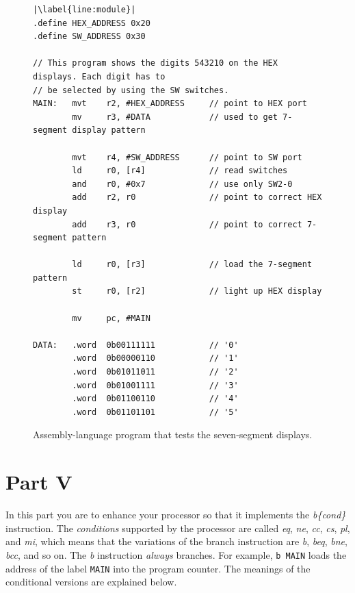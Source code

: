 \documentclass[epsfig,10pt,fullpage]{article} \addtolength{\textwidth}{1.5in}
\begin{document}
\lstset{language=ASM,numbers=none,escapechar=|}
\begin{figure}[h]
\begin{center}
\begin{minipage}[h]{15 cm}
\begin{lstlisting}[name=proc]
|\label{line:module}|
.define HEX_ADDRESS 0x20
.define SW_ADDRESS 0x30

// This program shows the digits 543210 on the HEX displays. Each digit has to
// be selected by using the SW switches.
MAIN:   mvt    r2, #HEX_ADDRESS     // point to HEX port
        mv     r3, #DATA            // used to get 7-segment display pattern

        mvt    r4, #SW_ADDRESS      // point to SW port
        ld     r0, [r4]             // read switches
        and    r0, #0x7             // use only SW2-0
        add    r2, r0               // point to correct HEX display
        add    r3, r0               // point to correct 7-segment pattern

        ld     r0, [r3]             // load the 7-segment pattern
        st     r0, [r2]             // light up HEX display

        mv     pc, #MAIN

DATA:   .word  0b00111111           // '0'
        .word  0b00000110           // '1'
        .word  0b01011011           // '2'
        .word  0b01001111           // '3'
        .word  0b01100110           // '4'
        .word  0b01101101           // '5'
\end{lstlisting}
\end{minipage}
\caption{Assembly-language program that tests the seven-segment displays.}
\label{fig:7segs}
\end{center}
\end{figure}

\section*{Part V}
In this part you are to enhance your processor so that it implements the {\it b\{cond\}}
instruction.  The {\it conditions} supported by the processor are called 
{\it eq}, {\it ne}, {\it cc}, {\it cs}, {\it pl}, and {\it mi}, which means that the variations 
of the branch instruction are {\it b}, {\it beq}, {\it bne}, {\it bcc}, and so on. The {\it b}
instruction {\it always} branches. For example, \texttt{b  MAIN} loads the address of the
label \texttt{MAIN} into the program counter. The meanings of the conditional versions are 
explained below.
\end{document}
